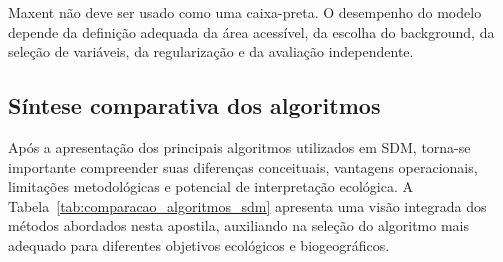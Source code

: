 \begin{conceito}[title={\faBook\quad Mensagem central}]
	Maxent não deve ser usado como uma caixa-preta. O desempenho do modelo depende da definição adequada da área acessível, da escolha do background, da seleção de variáveis, da regularização e da avaliação independente.
\end{conceito}

\subsection*{Síntese comparativa dos algoritmos}

Após a apresentação dos principais algoritmos utilizados em SDM, torna-se
importante compreender suas diferenças conceituais, vantagens operacionais,
limitações metodológicas e potencial de interpretação ecológica. A
Tabela~\ref{tab:comparacao_algoritmos_sdm} apresenta uma visão integrada dos
métodos abordados nesta apostila, auxiliando na seleção do algoritmo mais
adequado para diferentes objetivos ecológicos e biogeográficos.

